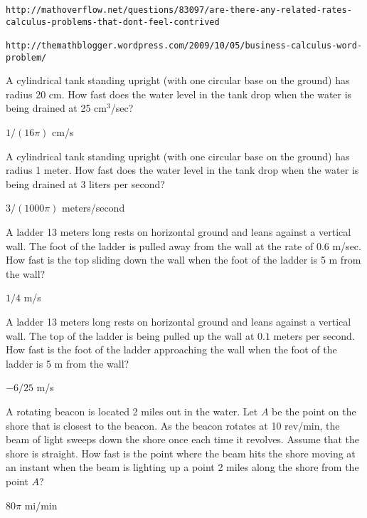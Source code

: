 \begin{verbatim}
http://mathoverflow.net/questions/83097/are-there-any-related-rates-calculus-problems-that-dont-feel-contrived

http://themathblogger.wordpress.com/2009/10/05/business-calculus-word-problem/
\end{verbatim}


\begin{exercises}

\begin{exercise}
A cylindrical tank standing upright (with one circular base on the
ground) has radius 20 cm.  How fast does the water level in the
tank drop when the water is being drained at 25 cm${}^3$/sec?
\begin{answer} $1/(16\pi)$ cm/s
\end{answer}\end{exercise}

\begin{exercise}
A cylindrical tank standing upright (with one circular base on the
ground) has radius 1 meter.  How fast does the water level in the
tank drop when the water is being drained at 3 liters per second?
\begin{answer} $3/(1000\pi)$ meters/second
\end{answer}\end{exercise}

\begin{exercise} A ladder 13 meters long rests on horizontal ground and leans
against a vertical wall.  The foot of the ladder is pulled away from
the wall at the rate of 0.6 m/sec.  How fast is the top sliding down
the wall when the foot of the ladder is 5 m from the wall?
\begin{answer} $1/4$ m/s
\end{answer}\end{exercise}

\begin{exercise} A ladder 13 meters long rests on horizontal ground and leans
against a vertical wall. The top of the ladder is being pulled up the
wall at $0.1$ meters per second.
How fast is the foot of the ladder approaching 
the wall when the foot of the ladder is 5 m from the wall?
\begin{answer} $-6/25$ m/s
\end{answer}\end{exercise}

\begin{exercise}
A rotating beacon is located 2 miles out in the water.  Let $A$ be the
point on the shore that is closest to the beacon.  As the beacon rotates at
10 rev/min, the beam of light sweeps down the shore once each time it revolves.
Assume that the shore is straight.  How fast is the point where the beam
hits the shore moving at an instant when the beam is lighting up a point 2
miles along the shore from the point $A$?
\begin{answer} $80\pi$ mi/min
\end{answer}\end{exercise}


\end{exercises}
